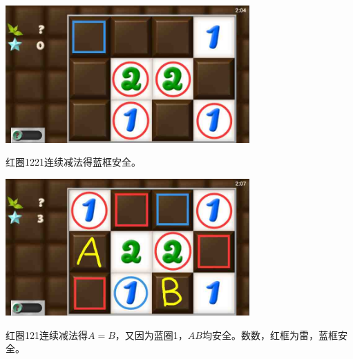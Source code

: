 \subsection{} %
\begin{center}
    \includegraphics[width=0.7\textwidth]{puzzlelow/25-1.jpg}
\end{center}
红圈1221连续减法得蓝框安全。
\begin{center}
    \includegraphics[width=0.7\textwidth]{puzzlelow/25-2.jpg}
\end{center}
红圈121连续减法得$A=B$，又因为蓝圈1，$AB$均安全。数数，红框为雷，蓝框安全。

